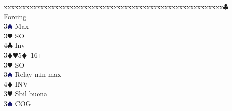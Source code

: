 \documentclass[a4paper,italian]{article}
\newcommand{\BC}{\textcolor{OliveGreen}{$\clubsuit$}}
\newcommand{\BD}{\textcolor{RedOrange}{$\vardiamondsuit$}}
\newcommand{\BH}{\textcolor{Red2}{$\varheartsuit${}}}
\newcommand{\BS}{\textcolor{MidnightBlue}{$\spadesuit${}}}
\newenvironment{bidtable}
{\begin{tabbing}

    xxxxxx\=xxxxxx\=xxxxxx\=xxxxxx\=xxxxxx\=xxxxxx\=xxxxxx\=xxxxxx\=xxxxxx\=xxxxxx\=\kill}
{\end{tabbing} }%
\begin{document}
\begin{multicols*}{2}
\begin{bidtable}
                                            4\BC \> Forcing\-\\
                                            3\BS \> Max\-\\
                                            3\BH \> SO\\
                                            4\BC \> Inv\-\\
                                            3\BD {}\BH 5\BD\ 16+\+\\
                                            3\BH \> SO\\
                                            3\BS \> Relay min max\\
                                            4\BD \> INV\-\\
                                            3\BH \> Sbil buona\+\\
                                            3\BS \> COG
                                        \end{bidtable}
                                    \end{multicols*}
                                    \newpage
\end{document}
